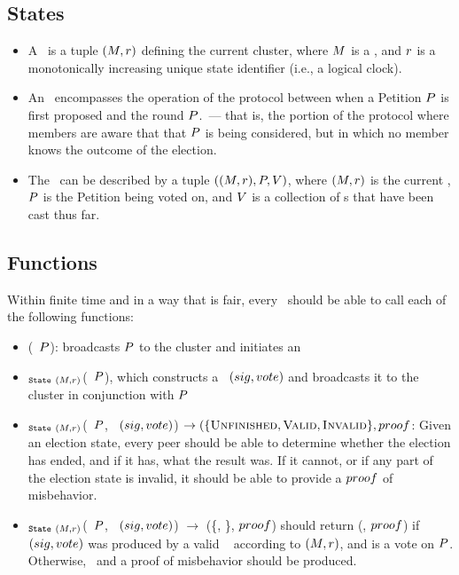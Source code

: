 \subsection{States}
\begin{itemize}
  \item A \StructState~is a tuple $(M, r)$ defining the current
    cluster, where $M$ is a \KwManifest, and $r$ is a
    monotonically increasing unique state identifier (i.e., a logical
    clock)\tocite.

  \item An \StructElection~encompasses the operation of the protocol between
    when a Petition $P$ is first proposed and the round
    $P$.\round~--- that is, the portion of the protocol where
    members are aware that that $P$ is being considered, but in which
    no member knows the outcome of the election.

  \item The \StructElectionState~can be described by a tuple $((M, r),
    P, V)$, where $(M, r)$ is the current \StructState,
    $P$ is the Petition being voted on, and $V$ is a
    collection of \StructBallot s that have been cast thus far.

\end{itemize}

\subsection{Functions}
Within finite time and in a way that is fair, every \KwPeer~should be able
to call each of the following functions:
\begin{itemize}
  \item \NamePropose(\StructPetition~$P$): broadcasts $P$
    to the cluster and initiates an \StructElection
  \item \NameVote$_{\texttt{State}~(M, r)}$(\StructPetition~$P$), which
    constructs a \StructBallot~$(sig, vote)$ and broadcasts it to the cluster in
    conjunction with $P$
  \item \NameEvaluate$_{\texttt{State}~(M, r)}$(\StructPetition~$P$,
    \StructBallot~$(sig, vote)$) $\to (\{\textsc{Unfinished}, \textsc{Valid},
    \textsc{Invalid}\}, proof$: Given an election state, every peer should be able
    to determine whether the election has ended, and if it has, what the result
    was. If it cannot, or if any part of the election state is invalid, it
    should be able to provide a $proof$ of misbehavior.
  \item \NameEvaluate$_{\texttt{State}~(M, r)}$(\StructPetition~$P$,
    \StructBallot~$(sig, vote)$) $\to$ (\{\AtomTrue, \AtomFalse\}, $proof$) should
    return (\AtomTrue, $proof$) if $(sig, vote)$ was produced by a valid \KwPeer~
    according to $(M, r)$, and is a vote on $P$. Otherwise,
    \AtomTrue~and a proof of misbehavior should be produced.
\end{itemize}

